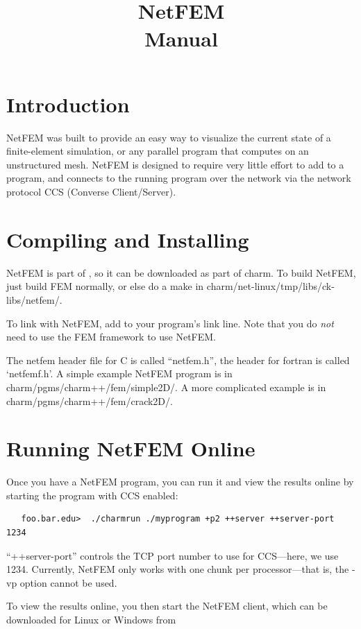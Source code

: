 \documentclass[10pt]{article}
\title{\charmpp\\ NetFEM\\ Manual}
\begin{document}
\maketitle

\section{Introduction}

NetFEM was built to provide an easy way to visualize
the current state of a finite-element simulation, or any 
parallel program that computes on an unstructured mesh.
NetFEM is designed to require very little effort to add
to a program, and connects to the running program over
the network via the network protocol CCS (Converse Client/Server).


\section{Compiling and Installing}

NetFEM is part of \charmpp{}, so it can be downloaded
as part of charm.  To build NetFEM, just build FEM normally,
or else do a make in charm/net-linux/tmp/libs/ck-libs/netfem/.

To link with NetFEM, add  to your
program's link line.  Note that you do {\em not} need to use
the FEM framework to use NetFEM.

The netfem header file for C is called ``netfem.h'',
the header for fortran is called `netfemf.h'.
A simple example NetFEM program is in 
  charm/pgms/charm++/fem/simple2D/.
A more complicated example is in
  charm/pgms/charm++/fem/crack2D/.


\section{Running NetFEM Online}

Once you have a NetFEM program, you can run it and view 
the results online by starting the program with CCS enabled:

\begin{verbatim}
   foo.bar.edu>  ./charmrun ./myprogram +p2 ++server ++server-port 1234
\end{verbatim}

``++server-port'' controls the TCP port number to use for CCS---here,
we use 1234.  Currently, NetFEM only works with one chunk per
processor---that is, the -vp option cannot be used.

To view the results online, you then start the NetFEM client, 
which can be downloaded for Linux or Windows from 
\end{document}
